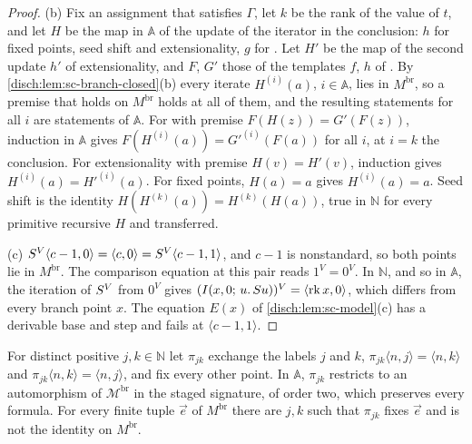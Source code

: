 \begin{proof}
(b) Fix an assignment that satisfies $\Gamma$, let $k$ be the rank of the
value of $t$, and let $H$ be the map in $\mathbb A$ of the update of the
iterator in the conclusion: $h$ for fixed points, seed shift and
extensionality, $g$ for . Let $H'$ be the map of the second
update $h'$ of extensionality, and $F$, $G'$ those of the templates $f$, $h$
of . By \cref{disch:lem:sc-branch-closed}(b) every iterate
$H^{(i)}(a)$, $i\in\mathbb A$, lies in $M^{\mathrm{br}}$, so a premise that
holds on $M^{\mathrm{br}}$ holds at all of them, and the resulting statements
for all $i$ are statements of $\mathbb A$. For  with premise
$F(H(z))=G'(F(z))$, induction in $\mathbb A$ gives
$F(H^{(i)}(a))=G'^{(i)}(F(a))$ for all $i$, at $i=k$ the conclusion. For
extensionality with premise $H(v)=H'(v)$, induction gives
$H^{(i)}(a)=H'^{(i)}(a)$. For fixed points, $H(a)=a$ gives $H^{(i)}(a)=a$.
Seed shift is the identity $H(H^{(k)}(a))=H^{(k)}(H(a))$, true in $\mathbb N$
for every primitive recursive $H$ and transferred.

(c) $S^V\langle c-1,0\rangle=\langle c,0\rangle=S^V\langle c-1,1\rangle$,
and $c-1$ is nonstandard, so both points lie in $M^{\mathrm{br}}$. The
comparison equation at this pair reads $1^V=0^V$. In $\mathbb N$, and so in
$\mathbb A$, the iteration of $S^V$ from $0^V$ gives
$(I(x,0;\,u.\,S u))^V=\langle\mathrm{rk}\,x,0\rangle$, which differs
from every branch point $x$. The equation $E(x)$ of
\cref{disch:lem:sc-model}(c) has a derivable base and step and fails at
$\langle c-1,1\rangle$.
\end{proof}

\begin{lemma}
\label{disch:lem:sc-branch-swap}
For distinct positive $j,k\in\mathbb N$ let $\pi_{jk}$ exchange the labels
$j$ and $k$, $\pi_{jk}\langle n,j\rangle=\langle n,k\rangle$ and
$\pi_{jk}\langle n,k\rangle=\langle n,j\rangle$, and fix every other point.
In $\mathbb A$, $\pi_{jk}$ restricts to an automorphism of
$\mathcal M^{\mathrm{br}}$ in the staged signature, of order two, which
preserves every formula. For every finite tuple $\vec e$ of
$M^{\mathrm{br}}$ there are $j,k$ such that $\pi_{jk}$ fixes $\vec e$ and is
not the identity on $M^{\mathrm{br}}$.
\end{lemma}

